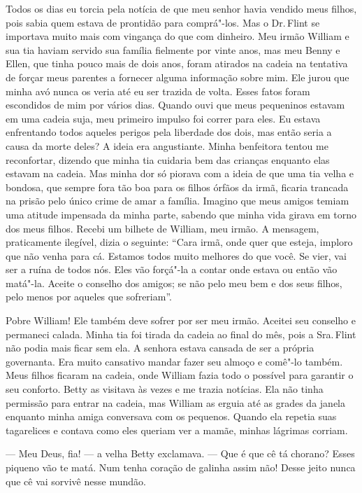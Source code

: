 Todos os dias eu torcia pela notícia de
que meu senhor havia vendido meus filhos, pois sabia quem estava de
prontidão para comprá"-los. Mas o Dr.\,Flint se importava muito mais com
vingança do que com dinheiro. Meu irmão William e sua tia haviam servido
sua família fielmente por vinte anos, mas meu Benny e Ellen, que tinha
pouco mais de dois anos, foram atirados na cadeia na tentativa de forçar
meus parentes a fornecer alguma informação sobre mim. Ele jurou que
minha avó nunca os veria até eu ser trazida de volta. Esses fatos foram
escondidos de mim por vários dias. Quando ouvi que meus pequeninos
estavam em uma cadeia suja, meu primeiro impulso foi correr para eles.
Eu estava enfrentando todos aqueles perigos pela liberdade dos dois, mas
então seria a causa da morte deles? A ideia era angustiante. Minha
benfeitora tentou me reconfortar, dizendo que minha tia cuidaria bem das
crianças enquanto elas estavam na cadeia. Mas minha dor só piorava com a
ideia de que uma tia velha e bondosa, que sempre fora tão boa para os
filhos órfãos da irmã, ficaria trancada na prisão pelo único crime de
amar a família. Imagino que meus amigos temiam uma atitude impensada da
minha parte, sabendo que minha vida girava em torno dos meus filhos.
Recebi um bilhete de William, meu irmão. A mensagem, praticamente
ilegível, dizia o seguinte: ``Cara irmã, onde quer que esteja, imploro
que não venha para cá. Estamos todos muito melhores do que você. Se
vier, vai ser a ruína de todos nós. Eles vão forçá"-la a contar onde
estava ou então vão matá"-la. Aceite o conselho dos amigos; se não pelo
meu bem e dos seus filhos, pelo menos por aqueles que sofreriam''.

Pobre William! Ele também deve sofrer
por ser meu irmão. Aceitei seu conselho e permaneci calada. Minha tia
foi tirada da cadeia ao final do mês, pois a Sra.\,Flint não podia mais
ficar sem ela. A senhora estava cansada de ser a própria governanta. Era
muito cansativo mandar fazer seu almoço e comê"-lo também. Meus filhos
ficaram na cadeia, onde William fazia todo o possível para garantir o
seu conforto. Betty as visitava às vezes e me trazia notícias. Ela não
tinha permissão para entrar na cadeia, mas William as erguia até as
grades da janela enquanto minha amiga conversava com os pequenos. Quando
ela repetia suas tagarelices e contava como eles queriam ver a mamãe,
minhas lágrimas corriam.

--- Meu Deus, fia! --- a velha Betty exclamava. --- Que é que cê tá
chorano? Esses piqueno vão te matá. Num tenha coração de galinha assim
não! Desse jeito nunca que cê vai sorvivê nesse mundão.

